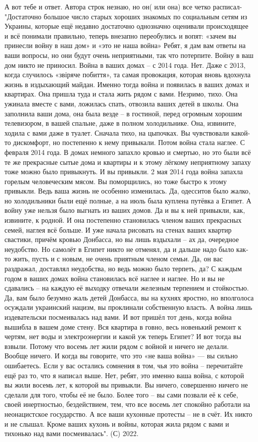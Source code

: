 А вот тебе и ответ. Автора строк незнаю, но он( или она) все четко расписал-
"Достаточно большое число старых хороших знакомых по социальным сетям из Украины, которые ещё недавно достаточно однозначно оценивали происходящее и всё понимали правильно, теперь внезапно переобулись и вопят: «зачем вы принесли войну в наш дом» и «это не наша война»
Ребят, я дам вам ответы на ваши вопросы, но они будут очень неприятными, так что потерпите.
Войну в ваш дом никто не приносил. Война в ваших домах – с 2014 года. Нет. Даже с 2013, когда случилось «звіряче побиття», та самая провокация, которая вновь вдохнула жизнь в издыхающий майдан.
Именно тогда война и появилась в ваших домах и квартирах. Она пришла туда и стала жить рядом с вами. Незримо, тихо. Она ужинала вместе с вами, ложилась спать, отвозила ваших детей в школы. Она заполнила ваши дома, она была везде – в гостиной, перед огромным хорошим телевизором, в вашей спальне, даже в полном холодильнике. Она, извините, ходила с вами даже в туалет. Сначала тихо, на цыпочках. Вы чувствовали какой-то дискомфорт, но постепенно к нему привыкали.
Потом война стала наглее. С февраля 2014 года. В домах немного запахло кровью и смертью, но это были всё те же прекрасные сытые дома и квартиры и к этому лёгкому неприятному запаху тоже можно было привыкнуть. И вы привыкли.
2 мая 2014 года война запахла горелым человеческим мясом. Вы поморщились, но тоже быстро к этому привыкли. Ведь ваша жизнь не особенно изменилась. Да, одесситов было жалко, но холодильники были ещё полные, а на июль была куплена путёвка а Египет.
А войну уже нельзя было выгнать из ваших домов. Да и вы к ней привыкли, как, извините, к родной. И она постепенно становилась членом ваших прекрасных семей, наглея всё больше. И уже начала рисовать на стенах ваших квартир свастики, причём кровью Донбасса, но вы лишь вздыхали – ах да, очередное неудобство. Но самолёт в Египет никто не отменял, да и дальше надо было как-то жить, пусть и с новым, не очень приятным членом семьи. Да, он вас раздражал, доставлял неудобства, но ведь можно было терпеть, да?
С каждым годом в ваших домах война становилась всё наглее и наглее. Но и вы не сдавались – на каждую её выходку отвечали железным терпением и стойкостью.
Да, вам было безумно жаль детей Донбасса, вы на кухнях яростно, но вполголоса осуждали украинский нацизм, вы проклинали собственную власть. А война лишь издевательски посмеивалась над вами.
И вот пришёл тот день, когда война вышибла в вашем доме стену. Вся квартира в говно, весь новенький ремонт к чертям, нет воды и электроэнергии и какой уж теперь Египет?
И вот тогда вы взвыли. Потому что восемь лет жили рядом с войной и ничего не делали. Вообще ничего.
И когда вы говорите, что это «не ваша война» — вы сильно ошибаетесь. Если у вас остались сомнения в том, чья это война – перечитайте ещё раз то, что я написал выше. Нет, ребят, это именно ваша война, с которой вы жили восемь лет, к которой вы привыкли. Вы ничего, совершенно ничего не сделали для того, чтобы её не было. Более того – вы сами позвали её к себе, своей инертностью, бездействием, тем, что все восемь лет спокойно работали на неонацистское государство.
А все ваши кухонные протесты – не в счёт. Их никто и не слышал. Кроме ваших кухонь и войны, которая жила рядом с вами и тихонько над вами посмеивалась".
(С) 2022.

